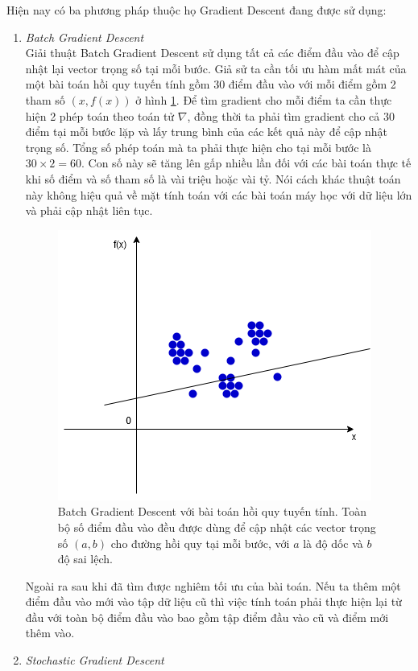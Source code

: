 Hiện nay có ba phương pháp thuộc họ Gradient Descent đang được sử dụng:
\begin{enumerate}
\item \emph{Batch Gradient Descent}\\
Giải thuật Batch Gradient Descent sử dụng tất cả các điểm đầu vào để cập nhật lại vector trọng số tại mỗi bước. Giả sử ta cần tối ưu hàm mất mát của một bài toán hồi quy tuyến tính gồm 30 điểm đầu vào với mỗi điểm gồm 2 tham số $\left(x,f\left(x\right)\right)$ ở hình \ref{fig:batch_gradient_descent}. Để tìm gradient cho mỗi điểm ta cần thực hiện 2 phép toán theo toán tử $\nabla$, đồng thời ta phải tìm gradient cho cả 30 điểm tại mỗi bước lặp và lấy trung bình của các kết quả này để cập nhật trọng số. Tổng số phép toán mà ta phải thực hiện cho tại mỗi bước là $30\times2=60$. Con số này sẽ tăng lên gấp nhiều lần đối với các bài toán thực tế khi số điểm và số tham số là vài triệu hoặc vài tỷ. Nói cách khác thuật toán này không hiệu quả về mặt tính toán với các bài toán máy học với dữ liệu lớn và phải cập nhật liên tục.
\begin{figure}[ht!]
	\centerline{\includegraphics[scale=0.6]{images/batch_gradient_descent.png}}
  	\caption{Batch Gradient Descent với bài toán hồi quy tuyến tính. Toàn bộ số điểm đầu vào đều được dùng để cập nhật các vector trọng số $(a,b)$ cho đường hồi quy tại mỗi bước, với $a$ là độ dốc và $b$ độ sai lệch.}
  	\label{fig:batch_gradient_descent}
\end{figure} 
Ngoài ra sau khi đã tìm được nghiêm tối ưu của bài toán. Nếu ta thêm một điểm đầu vào mới vào tập dữ liệu cũ thì việc tính toán phải thực hiện lại từ đầu với toàn bộ điểm đầu vào bao gồm tập điểm đầu vào cũ và điểm mới thêm vào.
\item \emph{Stochastic Gradient Descent}\\

\end{enumerate}
